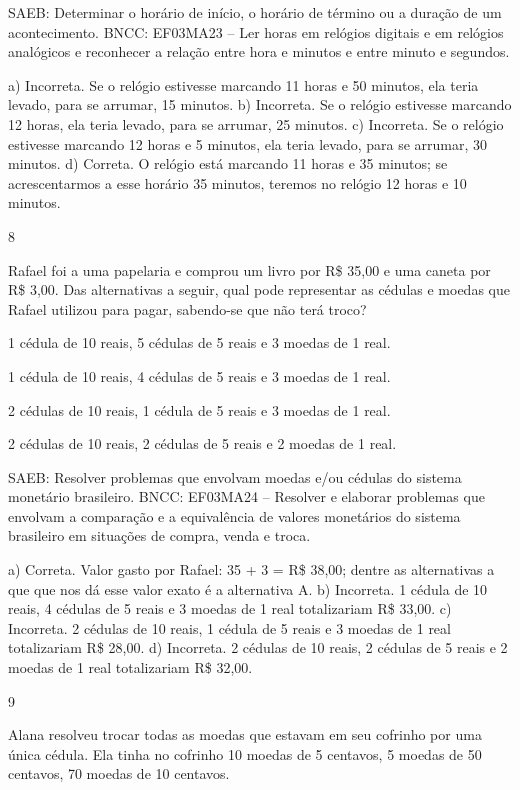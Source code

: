 \begin{multicols}{2}
{\begin{escolha}
{SAEB: Determinar o horário de início, o horário de término ou a duração de um acontecimento.
BNCC: EF03MA23 – Ler horas em relógios digitais e em relógios analógicos e reconhecer a relação
entre hora e minutos e entre minuto e segundos.

a) Incorreta. Se o relógio estivesse marcando 11 horas e 50 minutos, ela teria levado, para se arrumar, 15 minutos.
b) Incorreta. Se o relógio estivesse marcando 12 horas, ela teria levado, para se arrumar, 25 minutos.
c) Incorreta. Se o relógio estivesse marcando 12 horas e 5 minutos, ela teria levado, para se arrumar, 30 minutos.
d) Correta. O relógio está marcando 11 horas e 35 minutos; se acrescentarmos a esse horário 35 minutos, teremos no relógio 12 horas e 10 minutos.

\num{8}

Rafael foi a uma papelaria e comprou um livro por R\$ 35,00 e uma caneta
por R\$ 3,00. Das alternativas a seguir, qual pode representar as cédulas
e moedas que Rafael utilizou para pagar, sabendo-se que não terá troco?

\begin{escolha}

\item
  1 cédula de 10 reais, 5 cédulas de 5 reais e 3 moedas de 1 real.
\item
  1 cédula de 10 reais, 4 cédulas de 5 reais e 3 moedas de 1 real.
\item
  2 cédulas de 10 reais, 1 cédula de 5 reais e 3 moedas de 1 real.
\item
  2 cédulas de 10 reais, 2 cédulas de 5 reais e 2 moedas de 1 real.
\end{escolha}

SAEB: Resolver problemas que envolvam moedas e/ou cédulas do sistema monetário brasileiro.
BNCC: EF03MA24 -- Resolver e elaborar problemas que envolvam a comparação e a equivalência de
valores monetários do sistema brasileiro em situações de compra, venda e troca.

a) Correta. Valor gasto por Rafael: 35 + 3 = R\$ 38,00; dentre as alternativas a que que nos dá esse valor exato é a alternativa A.
b) Incorreta. 1 cédula de 10 reais, 4 cédulas de 5 reais e 3 moedas de 1 real totalizariam R\$ 33,00.
c) Incorreta. 2 cédulas de 10 reais, 1 cédula de 5 reais e 3 moedas de 1 real totalizariam R\$ 28,00.
d) Incorreta. 2 cédulas de 10 reais, 2 cédulas de 5 reais e 2 moedas de 1 real totalizariam R\$ 32,00.

\num{9}

Alana resolveu trocar todas as moedas que estavam em seu cofrinho por uma única cédula. Ela tinha no cofrinho 10 moedas de 5 centavos, 5 moedas de
50 centavos, 70 moedas de 10 centavos.

}
\end{escolha}}
\end{multicols}

